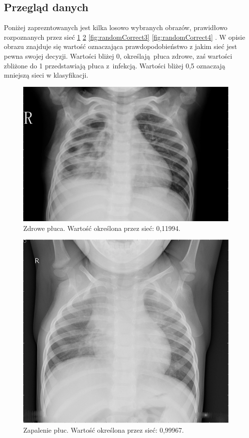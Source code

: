 \documentclass[12pt,a4paper,twoside,titlepage,openright]{book}
\begin{document}
\subsection{Przegląd danych}
Poniżej zaprezntowanych jest kilka losowo wybranych obrazów, prawidłowo rozpoznanych przez sieć \ref{fig:randomCorrect1} \ref{fig:randomCorrect2} \ref{fig:randomCorrect3} \ref{fig:randomCorrect4} . W opisie obrazu znajduje się wartość oznaczająca prawdopodobieństwo z jakim sieć jest pewna swojej decyzji. Wartości bliżej 0, określają płuca zdrowe, zaś wartości zbliżone do 1 przedstawiają płuca z infekcją. Wartości bliżej 0,5 oznaczają mniejszą sieci w klasyfikacji.

\begin{figure}[ht]
	\centering
			\includegraphics[resolution=100, scale=0.3]{randomCorrect1.png}
		\caption{Zdrowe płuca. Wartość określona przez sieć: 0,11994.}
				\label{fig:randomCorrect1}
\end{figure}

\begin{figure}[ht]
	\centering
			\includegraphics[resolution=100, scale=0.3]{randomCorrect2.png}
		\caption{Zapalenie płuc. Wartość określona przez sieć: 0,99967.}
				\label{fig:randomCorrect2}
\end{figure}
\end{document}

